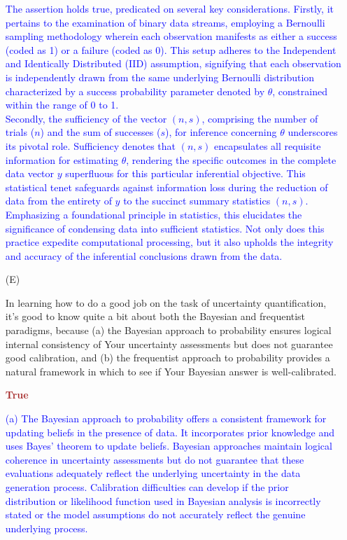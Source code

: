 \documentclass[12pt]{article}
\begin{document}
\begin{itemize}
\textcolor{blue}{
The assertion holds true, predicated on several key considerations. Firstly, it pertains to the examination of binary data streams, employing a Bernoulli sampling methodology wherein each observation manifests as either a success (coded as 1) or a failure (coded as 0). This setup adheres to the Independent and Identically Distributed (IID) assumption, signifying that each observation is independently drawn from the same underlying Bernoulli distribution characterized by a success probability parameter denoted by $\theta$, constrained within the range of 0 to 1.
\\
Secondly, the sufficiency of the vector $(n, s)$, comprising the number of trials (\(n\)) and the sum of successes (\(s\)), for inference concerning $\theta$ underscores its pivotal role. Sufficiency denotes that $(n, s)$ encapsulates all requisite information for estimating $\theta$, rendering the specific outcomes in the complete data vector \(y\) superfluous for this particular inferential objective. This statistical tenet safeguards against information loss during the reduction of data from the entirety of \(y\) to the succinct summary statistics $(n, s)$.
\\
Emphasizing a foundational principle in statistics, this elucidates the significance of condensing data into sufficient statistics. Not only does this practice expedite computational processing, but it also upholds the integrity and accuracy of the inferential conclusions drawn from the data.}

\item[(E)]

In learning how to do a good job on the task of uncertainty quantification,
it's good to know quite a bit about both the Bayesian and frequentist
paradigms, because (a) the Bayesian approach to probability ensures logical
internal consistency of Your uncertainty assessments but does not guarantee
good calibration, and (b) the frequentist approach to probability provides
a natural framework in which to see if Your Bayesian answer is
well-calibrated.

\textcolor{brown}{\textbf{True}}

\textcolor{blue}{(a) The Bayesian approach to probability offers a consistent framework for updating beliefs in the presence of data. It incorporates prior knowledge and uses Bayes' theorem to update beliefs. Bayesian approaches maintain logical coherence in uncertainty assessments but do not guarantee that these evaluations adequately reflect the underlying uncertainty in the data generation process. Calibration difficulties can develop if the prior distribution or likelihood function used in Bayesian analysis is incorrectly stated or the model assumptions do not accurately reflect the genuine underlying process.}


\end{itemize}
\end{document}
